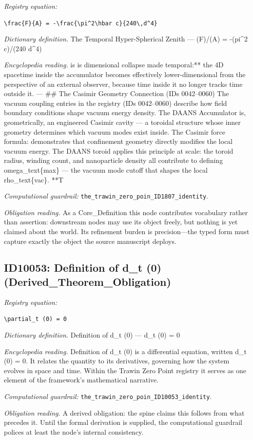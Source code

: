 \documentclass[11pt]{article}
\theoremstyle{remark}
\begin{document}
\noindent\textit{Registry equation:}\par
{\small\texttt{\textbackslash{}frac\{F\}\{A\} = -\textbackslash{}frac\{\textbackslash{}pi\textasciicircum{}2\textbackslash{}hbar c\}\{240\textbackslash{},d\textasciicircum{}4\}}}\par\medskip
\noindent\textit{Dictionary definition.} The Temporal Hyper-Spherical Zenith --- (F)/(A) = -(pi\textasciicircum{}2 c)/(240 d\textasciicircum{}4)\par\medskip
\noindent\textit{Encyclopedia reading.} is is dimensional collapse made temporal:** the 4D spacetime inside the accumulator becomes effectively lower-dimensional from the perspective of an external observer, because time inside it no longer tracks time outside it. --- \#\# The Casimir Geometry Connection (IDs 0042--0060) The vacuum coupling entries in the registry (IDs 0042--0060) describe how field boundary conditions shape vacuum energy density. The DAANS Accumulator is, geometrically, an engineered Casimir cavity --- a toroidal structure whose inner geometry determines which vacuum modes exist inside. The Casimir force formula: demonstrates that confinement geometry directly modifies the local vacuum energy. The DAANS toroid applies this principle at scale: the toroid radius, winding count, and nanoparticle density all contribute to defining omega\_text\{max\} --- the vacuum mode cutoff that shapes the local rho\_text\{vac\}. **T
\par\medskip\noindent\textit{Computational guardrail:} \texttt{the\_trawin\_zero\_poin\_ID1807\_identity}.
\par\medskip\noindent\textit{Obligation reading.} As a Core\_Definition this node contributes vocabulary rather than assertion: downstream nodes may use its object freely, but nothing is yet claimed about the world. Its refinement burden is precision---the typed form must capture exactly the object the source manuscript deploys.

\subsection{ID10053: Definition of d\_t (0) (Derived\_Theorem\_Obligation)}

\noindent\textit{Registry equation:}\par
{\small\texttt{\textbackslash{}partial\_t (0) = 0}}\par\medskip
\noindent\textit{Dictionary definition.} Definition of d\_t (0) --- d\_t (0) = 0\par\medskip
\noindent\textit{Encyclopedia reading.} Definition of d\_t (0) is a differential equation, written d\_t (0) = 0. It relates the quantity to its derivatives, governing how the system evolves in space and time. Within the Trawin Zero Point registry it serves as one element of the framework's mathematical narrative.
\par\medskip\noindent\textit{Computational guardrail:} \texttt{the\_trawin\_zero\_poin\_ID10053\_identity}.
\par\medskip\noindent\textit{Obligation reading.} A derived obligation: the spine claims this follows from what precedes it. Until the formal derivation is supplied, the computational guardrail polices at least the node's internal consistency.
\end{document}
